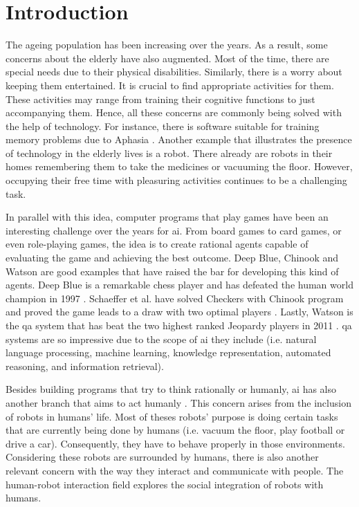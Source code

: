 \section{Introduction} \label{introduction}

The ageing population has been increasing over the years.
As a result, some concerns about the elderly have also augmented.
Most of the time, there are special needs due to their physical disabilities.
Similarly, there is a worry about keeping them entertained.
It is crucial to find appropriate activities for them.
These activities may range from training their cognitive functions to just accompanying them.
Hence, all these concerns are commonly being solved with the help of technology.
For instance, there is software suitable for training memory problems due to Aphasia \cite{Pompili2011}.
Another example that illustrates the presence of technology in the elderly lives is a robot.
There already are robots in their homes remembering them to take the medicines or vacuuming the floor.
However, occupying their free time with pleasuring activities continues to be a challenging task.


In parallel with this idea, computer programs that play games have been an interesting challenge over the years for \gls{ai}.
From board games to card games, or even role-playing games, the idea is to create rational agents capable of evaluating the game and achieving the best outcome.
Deep Blue, Chinook and Watson are good examples that have raised the bar for developing this kind of agents.
Deep Blue is a remarkable chess player and has defeated the human world champion in 1997 \cite{Campbell2002}.
Schaeffer et al. have solved Checkers with Chinook program and proved the game leads to a draw with two optimal players \cite{Schaeffer1996}.
Lastly, Watson is the \gls{qa} system that has beat the two highest ranked Jeopardy players in 2011 \cite{Ferrucci2010}.
\gls{qa} systems are so impressive due to the scope of \gls{ai} they include (i.e. natural language processing, machine learning, knowledge representation, automated reasoning, and information retrieval).

Besides building programs that try to think rationally or humanly, \gls{ai} has also another branch that aims to act humanly \cite{Russell2009}.
This concern arises from the inclusion of robots in humans' life.
Most of theses robots' purpose is doing certain tasks that are currently being done by humans (i.e. vacuum the floor, play football or drive a car).
Consequently, they have to behave properly in those environments.
Considering these robots are surrounded by humans, there is also another relevant concern with the way they interact and communicate with people.
The human-robot interaction field explores the social integration of robots with humans.

